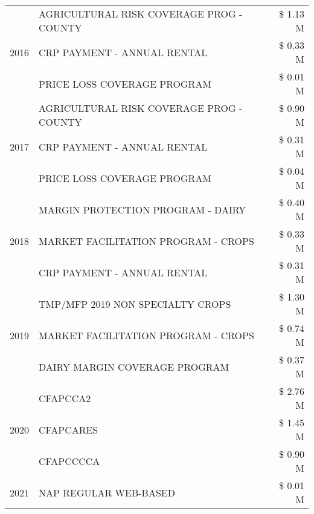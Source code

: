 \begin{tabular}{llr}
\cline{1-3}
\multirow[t]{3}{*}{2016} & AGRICULTURAL RISK COVERAGE PROG - COUNTY & \$ 1.13 M \\
 & CRP PAYMENT - ANNUAL RENTAL & \$ 0.33 M \\
 & PRICE LOSS COVERAGE PROGRAM & \$ 0.01 M \\
\cline{1-3}
\multirow[t]{3}{*}{2017} & AGRICULTURAL RISK COVERAGE PROG - COUNTY & \$ 0.90 M \\
 & CRP PAYMENT - ANNUAL RENTAL & \$ 0.31 M \\
 & PRICE LOSS COVERAGE PROGRAM & \$ 0.04 M \\
\cline{1-3}
\multirow[t]{3}{*}{2018} & MARGIN PROTECTION PROGRAM - DAIRY & \$ 0.40 M \\
 & MARKET FACILITATION PROGRAM - CROPS & \$ 0.33 M \\
 & CRP PAYMENT - ANNUAL RENTAL & \$ 0.31 M \\
\cline{1-3}
\multirow[t]{3}{*}{2019} & TMP/MFP 2019 NON SPECIALTY CROPS & \$ 1.30 M \\
 & MARKET FACILITATION PROGRAM - CROPS & \$ 0.74 M \\
 & DAIRY MARGIN COVERAGE PROGRAM & \$ 0.37 M \\
\cline{1-3}
\multirow[t]{3}{*}{2020} & CFAPCCA2 & \$ 2.76 M \\
 & CFAPCARES & \$ 1.45 M \\
 & CFAPCCCCA & \$ 0.90 M \\
\cline{1-3}
2021 & NAP REGULAR WEB-BASED & \$ 0.01 M \\
\cline{1-3}
\bottomrule
\end{tabular}
